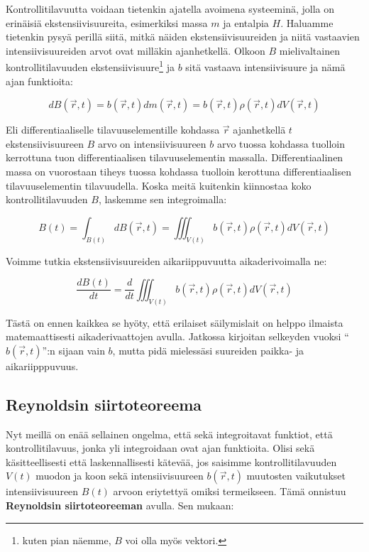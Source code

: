 \documentclass[12pt,a4paper,finnish]{book}
\begin{document}
Kontrollitilavuutta voidaan tietenkin ajatella avoimena systeeminä, jolla on erinäisiä ekstensiivisuureita, 
esimerkiksi massa $m$ ja entalpia $H$. Haluamme tietenkin pysyä perillä siitä, mitkä näiden ekstensiivisuureiden 
ja niitä vastaavien intensiivisuureiden arvot ovat milläkin ajanhetkellä. Olkoon $B$ mielivaltainen 
kontrollitilavuuden ekstensiivisuure\footnote{kuten pian näemme, $B$ voi olla myös vektori.} ja $b$ sitä vastaava 
intensiivisuure ja nämä ajan funktioita:

\begin{equation}
 dB(\vec{r}, t) = b(\vec{r}, t)dm(\vec{r}, t) = b(\vec{r}, t)\rho(\vec{r}, t)dV(\vec{r}, t)
\end{equation}

Eli differentiaaliselle tilavuuselementille kohdassa $\vec{r}$ ajanhetkellä $t$ ekstensiivisuureen $B$ arvo on 
intensiivisuureen $b$ arvo tuossa kohdassa tuolloin kerrottuna tuon differentiaalisen tilavuuselementin massalla.
Differentiaalinen massa on vuorostaan tiheys tuossa kohdassa tuolloin kerottuna differentiaalisen tilavuuselementin
tilavuudella. 
Koska meitä kuitenkin kiinnostaa koko kontrollitilavuuden $B$, laskemme sen integroimalla:

\begin{equation}
 B(t) = \int_{B(t)} dB(\vec{r}, t) = \iiint_{V(t)} b(\vec{r}, t)\rho(\vec{r}, t)dV(\vec{r}, t)
\end{equation}

Voimme tutkia ekstensiivisuureiden aikariippuvuutta aikaderivoimalla ne:

\begin{equation}
 \label{eq:dBdt}
 \frac{dB(t)}{dt} = \frac{d}{dt}\iiint_{V(t)} b(\vec{r}, t)\rho(\vec{r}, t)dV(\vec{r}, t)
\end{equation}

Tästä on ennen kaikkea se hyöty, että erilaiset säilymislait on helppo ilmaista matemaattisesti aikaderivaattojen avulla. 
Jatkossa kirjoitan selkeyden vuoksi ``$b(\vec{r}, t)$'':n sijaan vain $b$, mutta pidä mielessäsi suureiden 
paikka- ja aikariipppuvuus.

\subsection{Reynoldsin siirtoteoreema}

Nyt meillä on enää sellainen ongelma, että sekä integroitavat funktiot, että kontrollitilavuus, jonka 
yli integroidaan ovat ajan funktioita. Olisi sekä käsitteellisesti että laskennallisesti kätevää, jos 
saisimme kontrollitilavuuden $V(t)$ muodon ja koon sekä intensiivisuureen $b(\vec{r}, t)$ muutosten vaikutukset 
intensiivisuureen $B(t)$ arvoon eriytettyä omiksi termeikseen. Tämä onnistuu \textbf{Reynoldsin siirtoteoreeman} 
avulla. Sen mukaan:
\end{document}
